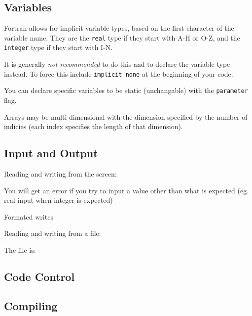 \subsection{Variables}
Fortran allows for implicit variable types, based on the first character of the variable name. They are the \texttt{real} type if they start with A-H or O-Z, and the \texttt{integer} type if they start with I-N.

It is generally \emph{not recommended} to do this and to declare the variable type instead. To force this include \texttt{implicit none} at the beginning of your code.

You can declare specific variables to be static (unchangable) with the \texttt{parameter} flag.

Arrays may be multi-dimensional with the dimension specified by the number of indicies (each index specifies the length of that dimension).
\begin{quote}

\end{quote}


\subsection{Input and Output}
Reading and writing from the screen:
\begin{quote}

\end{quote}
You will get an error if you try to input a value other than what is expected (eg. real input when integer is expected)


Formated writes
\begin{quote}

\end{quote}


Reading and writing from a file:
\begin{quote}

\end{quote}
The file is:
\begin{quote}

\end{quote}

\subsection{Code Control}

\subsection{Compiling}



